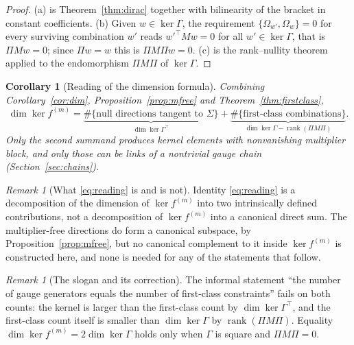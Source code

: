 \documentclass[12pt]{article}
\theoremstyle{plain}
\newtheorem{corollary}[theorem]{Corollary}
\theoremstyle{definition}
\theoremstyle{remark}
\newtheorem{remark}[theorem]{Remark}
\DeclareMathOperator{\rank}{rank}
\newcommand{\Om}{\Omega}
\begin{document}
	\begin{proof}
		(a) is Theorem~\ref{thm:dirac} together with bilinearity of the bracket in
		constant coefficients. (b) Given $w\in\ker\Gamma$, the requirement
		$\{\Om_{w'},\Om_{w}\}=0$ for every surviving combination $w'$ reads
		$w'^{\top}Mw=0$ for all $w'\in\ker\Gamma$, that is $\Pi Mw=0$; since $\Pi w=w$
		this is $\Pi M\Pi w=0$. (c) is the rank--nullity theorem applied to the
		endomorphism $\Pi M\Pi$ of $\ker\Gamma$.
	\end{proof}
	
	\begin{corollary}[Reading of the dimension formula]
		\label{cor:reading}
		Combining Corollary~\ref{cor:dim}, Proposition~\ref{prop:mfree} and
		Theorem~\ref{thm:firstclass},
		\begin{equation}
			\dim\ker f^{(m)}
			=\underbrace{\#\{\text{null directions tangent to }\Sigma\}}
			_{\dim\ker\Gamma^{\top}}
			+\underbrace{\#\{\text{first-class combinations}\}}
			_{\dim\ker\Gamma-\rank(\Pi M\Pi)} .
			\label{eq:reading}
		\end{equation}
		Only the second summand produces kernel elements with nonvanishing multiplier
		block, and only those can be links of a nontrivial gauge chain
		(Section~\ref{sec:chains}).
	\end{corollary}
	
	\begin{remark}[What \eqref{eq:reading} is and is not]
		\label{rem:dimonly}
		Identity \eqref{eq:reading} is a decomposition of the dimension of
		$\ker f^{(m)}$ into two intrinsically defined contributions, not a
		decomposition of $\ker f^{(m)}$ into a canonical direct sum. The
		multiplier-free directions do form a canonical subspace, by
		Proposition~\ref{prop:mfree}, but no canonical complement to it inside
		$\ker f^{(m)}$ is constructed here, and none is needed for any of the
		statements that follow.
	\end{remark}
	
	\begin{remark}[The slogan and its correction]
		The informal statement ``the number of gauge generators equals the number of
		first-class constraints'' fails on both counts: the kernel is larger than the
		first-class count by $\dim\ker\Gamma^{\top}$, and the first-class count itself is
		smaller than $\dim\ker\Gamma$ by $\rank(\Pi M\Pi)$. Equality
		$\dim\ker f^{(m)}=2\dim\ker\Gamma$ holds only when $\Gamma$ is square and
		$\Pi M\Pi=0$.
	\end{remark}
	
\end{document}
